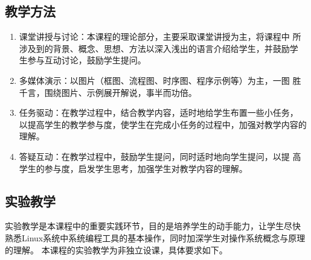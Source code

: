 \documentclass{swfusyllabus}
\begin{document}
\subsection{教学方法}

\begin{enumerate}
\item 课堂讲授与讨论：本课程的理论部分，主要采取课堂讲授为主，将课程中
  所涉及到的背景、概念、思想、方法以深入浅出的语言介绍给学生，并鼓励学
  生参与互动讨论，鼓励学生提问。
\item 多媒体演示：以图片（框图、流程图、时序图、程序示例等）为主，一图
  胜千言，围绕图片、示例展开解说，事半而功倍。
\item 任务驱动：在教学过程中，结合教学内容，适时地给学生布置一些小任务，
  以提高学生的教学参与度，使学生在完成小任务的过程中，加强对教学内容的
  理解。
\item 答疑互动：在教学过程中，鼓励学生提问，同时适时地向学生提问，以提
  高学生的参与度，启发学生思考，加强学生对教学内容的理解。
\end{enumerate}

\subsection{实验教学}%

实验教学是本课程中的重要实践环节，目的是培养学生的动手能力，让学生尽快
熟悉Linux系统中系统编程工具的基本操作，同时加深学生对操作系统概念与原理的理解。
本课程的实验教学为非独立设课，具体要求如下。
\end{document}
